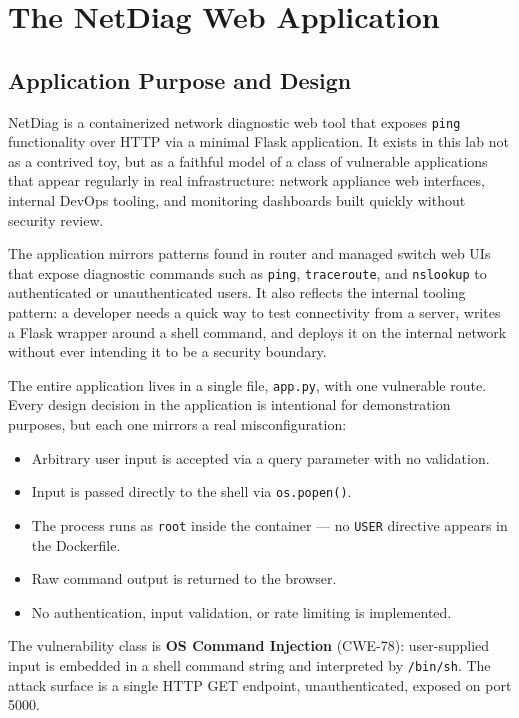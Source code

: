 \chapter{The NetDiag Web Application}

\section{Application Purpose and Design}

NetDiag is a containerized network diagnostic web tool that exposes \texttt{ping} functionality over HTTP via a minimal Flask application. It exists in this lab not as a contrived toy, but as a faithful model of a class of vulnerable applications that appear regularly in real infrastructure: network appliance web interfaces, internal DevOps tooling, and monitoring dashboards built quickly without security review.

The application mirrors patterns found in router and managed switch web UIs that expose diagnostic commands such as \texttt{ping}, \texttt{traceroute}, and \texttt{nslookup} to authenticated or unauthenticated users. It also reflects the internal tooling pattern: a developer needs a quick way to test connectivity from a server, writes a Flask wrapper around a shell command, and deploys it on the internal network without ever intending it to be a security boundary.

The entire application lives in a single file, \texttt{app.py}, with one vulnerable route. Every design decision in the application is intentional for demonstration purposes, but each one mirrors a real misconfiguration:

\begin{itemize}
    \item Arbitrary user input is accepted via a query parameter with no validation.
    \item Input is passed directly to the shell via \texttt{os.popen()}.
    \item The process runs as \texttt{root} inside the container — no \texttt{USER} directive appears in the Dockerfile.
    \item Raw command output is returned to the browser.
    \item No authentication, input validation, or rate limiting is implemented.
\end{itemize}

The vulnerability class is \textbf{OS Command Injection} (CWE-78): user-supplied input is embedded in a shell command string and interpreted by \texttt{/bin/sh}. The attack surface is a single HTTP GET endpoint, unauthenticated, exposed on port 5000.


